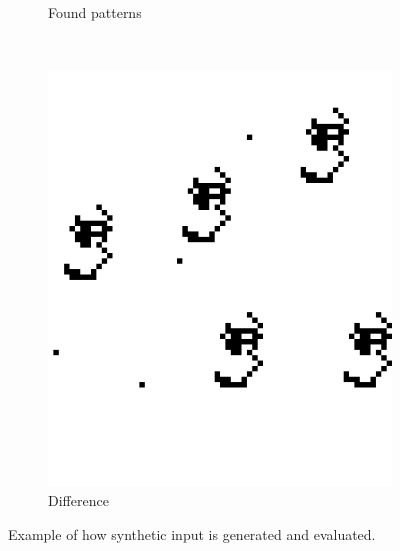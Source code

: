 \documentclass{llncs}
\begin{document}
\begin{figure}[p]
\begin{subfigure}[t]{0.25\textwidth}
\caption{Found patterns}
\label{fig:rilc}
\end{subfigure}%
~
\begin{subfigure}[t]{0.25\textwidth}
\centering
\includegraphics[scale=.9]{img/exp_diff_2_cropped.png}
\caption{Difference}
\label{fig:rild}
\end{subfigure}%
\caption{Example of how synthetic input is generated and evaluated.}
\label{fig:ril}
\end{figure}  
\end{document}
